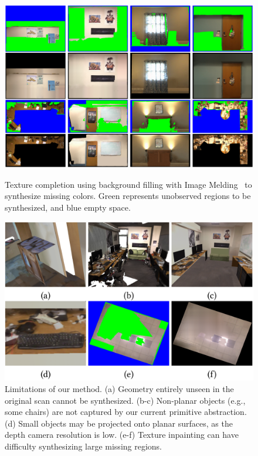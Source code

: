 \begin{figure}
\begin{minipage}{0.49\linewidth}
\centering
\includegraphics[width=\linewidth]{3dlite/fig20.png}
\caption{Texture completion using background filling with Image Melding~\cite{darabi2012image} to synthesize missing colors. Green represents unobserved regions to be synthesized, and blue empty space.}
\label{fig:3dlite-eval-complete}
\end{minipage}
\begin{minipage}{0.49\linewidth}
    \centering
    \includegraphics[width=\linewidth]{3dlite/fig21.png}
\caption{Limitations of our method. (a) Geometry entirely unseen in the original scan cannot be synthesized. (b-c) Non-planar objects (e.g., some chairs) are not captured by our current primitive abstraction. (d) Small objects may be projected onto planar surfaces, as the depth camera resolution is low. (e-f) Texture inpainting can have difficulty synthesizing large missing regions.}
    \label{fig:3dlite-limitation}
\end{minipage}
\end{figure}


